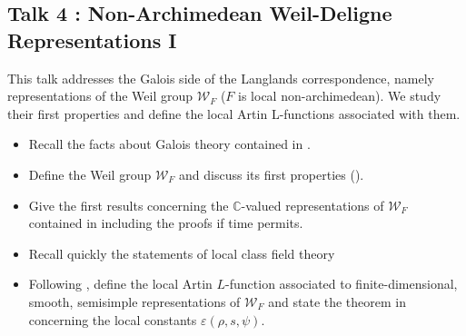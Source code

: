 \documentclass[11pt]{amsart}
\newcommand{\C}{\mathbb{C}}
\begin{document}
\subsection{Talk 4 : Non-Archimedean Weil-Deligne Representations I}
This talk addresses the Galois side of the Langlands correspondence, namely representations
of the Weil group $\mathcal{W}_F$ ($F$ is local non-archimedean). We study their first properties and define the local Artin L-functions
associated with them.
\begin{itemize}
    \item Recall the facts about Galois theory contained in \cite[\S 28.1-28.3]{BH06}.
    \item Define the Weil group $\mathcal{W}_F$ and discuss its first properties (\cite[\S 28.4-28.5]{BH06}).
    \item Give the first results concerning the $\C$-valued representations of $\mathcal{W}_F$ contained in \cite[\S 28.6-28.7]{BH06} including the proofs if time permits.
    \item Recall quickly the statements of local class field theory \cite[\S 29.1]{BH06}
    \item Following \cite[\S 29.2-29.4]{BH06}, define the local Artin $L$-function associated to finite-dimensional, smooth, semisimple representations of $\mathcal{W}_F$ and state the theorem in \cite[\S 29.4]{BH06} concerning the local constants $\varepsilon(\rho,s,\psi)$.
\end{itemize}






\end{document}
